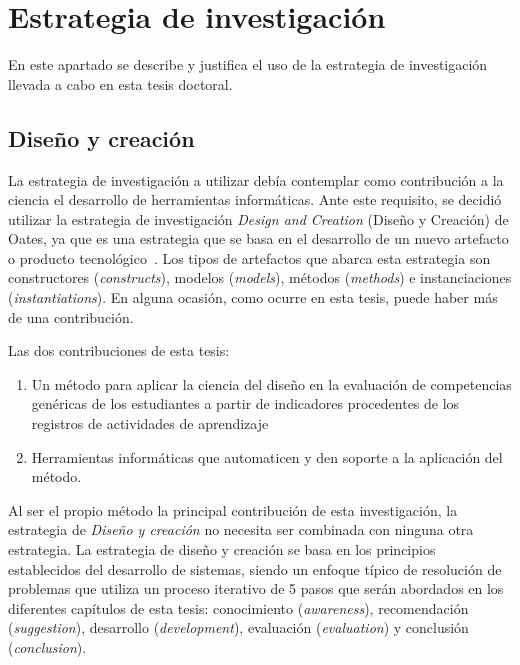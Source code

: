 
\section{Estrategia de investigación}
\label{sec:EstrategiaInvestigacion}

En este apartado se describe y justifica el uso de la estrategia de investigación llevada a cabo en esta tesis doctoral.  %

\subsection{Diseño y creación} %

La estrategia de investigación a utilizar debía contemplar como contribución a la ciencia el desarrollo de herramientas informáticas. Ante este requisito, se decidió utilizar la estrategia de investigación \emph{Design and Creation} (Diseño y Creación) de Oates, ya que es una estrategia que se basa en el desarrollo de un nuevo artefacto o producto tecnológico~\cite{oates2006researching}. Los tipos de artefactos que abarca esta estrategia son constructores (\emph{constructs}), modelos (\emph{models}), métodos (\emph{methods}) e instanciaciones (\emph{instantiations}). En alguna ocasión, como ocurre en esta tesis, puede haber más de una contribución.

Las dos contribuciones de esta tesis:
\begin{enumerate}
\item Un método para aplicar la ciencia del diseño en la evaluación de competencias genéricas de los estudiantes a partir de indicadores procedentes de los registros de actividades de aprendizaje
\item Herramientas informáticas que automaticen y den soporte a la aplicación del método.
\end{enumerate} 

Al ser el propio método la principal contribución de esta investigación, la estrategia de \emph{Diseño y creación} no necesita ser combinada con ninguna otra estrategia. La estrategia de diseño y creación se basa en los principios establecidos del desarrollo de sistemas, siendo un enfoque típico de resolución de problemas que utiliza un proceso iterativo de 5 pasos que serán abordados en los diferentes capítulos de esta tesis: conocimiento (\emph{awareness}), recomendación (\emph{suggestion}), desarrollo (\emph{development}), evaluación (\emph{evaluation}) y conclusión (\emph{conclusion}).

